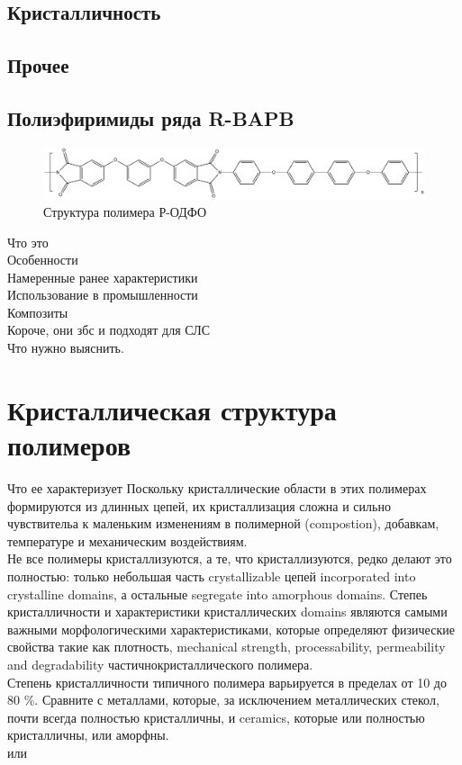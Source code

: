 \subsection{Кристалличность}

\subsection{Прочее}


\subsection{Полиэфиримиды ряда R-BAPB }
		
	\begin{figure}[h]
	\includegraphics[width=\textwidth]{fig/formula.png}
	\caption{Структура полимера Р-ОДФО \cite{pi-formula}}
	\label{fig:formula}
	\end{figure}

Что это\\
Особенности\\
Намеренные ранее характеристики\\
Использование в промышленности\\
Композиты\\
Короче, они збс и подходят для СЛС\\
Что нужно выяснить.\\

\section{Кристаллическая структура полимеров}

Что ее характеризует
Поскольку кристаллические области в этих полимерах формируются из длинных цепей, их кристаллизация сложна и сильно чувствительа к маленьким изменениям в полимерной (compostion), добавкам, температуре и механическим воздействиям.\\
Не все полимеры кристаллизуются, а те, что кристаллизуются, редко делают это полностью: только небольшая часть crystallizable цепей incorporated into crystalline domains, а остальные segregate into amorphous domains. Степеь кристалличности и характеристики кристаллических domains являются самыми важными морфологическими характеристиками, которые определяют физические свойства такие как плотность, mechanical strength, processability, permeability and degradability частичнокристаллического полимера.\\
Степень кристалличности типичного полимера варьируется в пределах от 10 до 80 \%. Сравните с металлами, которые, за исключением металлических стекол, почти всегда полностью кристалличны, и ceramics, которые или полностью кристалличны, или аморфны.\\ \cite{cryst3} или \cite{cryst1}






